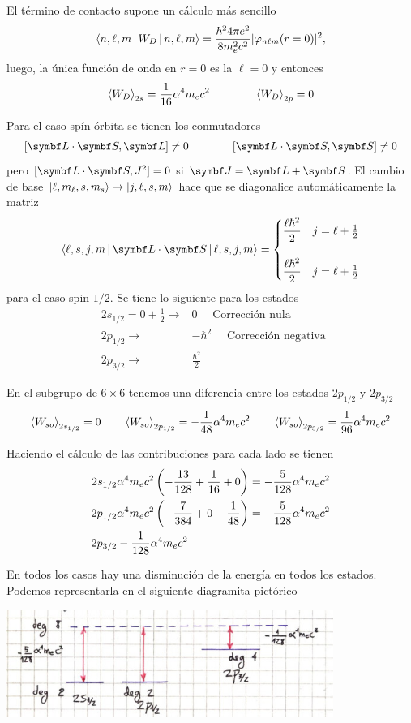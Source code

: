 \documentclass[10pt,oneside]{CBFT_book}
\begin{document}
El término de contacto supone un cálculo más sencillo
\[
	\Braket{n,\ell,m|W_D|n,\ell,m} = \frac{\hbar^2 4 \pi e^2}{8 m_ e^2 c^2} 
	| \varphi_{n\ell m}(r=0)|^2,
\]
luego, la única función de onda en $r=0$ es la $\ell=0$ y entonces
\[
	\Braket{W_D}_{2s} = \frac{1}{16} \alpha^4 m_e c^2
	\qquad \qquad 
	\Braket{W_D}_{2p} = 0
\]

Para el caso spín-órbita se tienen los conmutadores
\[
	[\pe{L}{S}, \vb L] \neq 0 \qquad \qquad [\pe{L}{S}, \vb S] \neq 0
\]
pero $[\pe{L}{S}, J^2]=0$ si $\vb J = \vb L + \vb S$.
El cambio de base $\Ket{\ell,m_\ell,s, m_s} \to \Ket{j,\ell,s,m}$  hace que se diagonalice 
automáticamente la matriz
\[
	\Braket{\ell,s,j,m|\pe{L}{S}|\ell,s,j,m}  = 
	\begin{cases}
	 \displaystyle  \frac{\ell \hbar^2}{2} & j = \ell + \frac 1 2 \\
	 \\
	 \displaystyle  \frac{\ell \hbar^2}{2} & j = \ell + \frac 1 2 
	\end{cases}
\]
para el caso spin $1/2$. Se tiene lo siguiente para los estados 
\begin{eqnarray*}
 &2s_{1/2} = 0 + \frac{1}{2} \longrightarrow & 0 \quad \text{ Corrección nula }\\
 &2p_{1/2} \longrightarrow & -\hbar^2 \quad \text{ Corrección negativa } \\
 &2p_{3/2}  \longrightarrow & \frac{\hbar^2}{2}
 \end{eqnarray*}

 En el subgrupo de $6\times 6$ tenemos una diferencia entre los estados $2p_{1/2}$ y $2p_{3/2}$
 \[
	\Braket{W_{so}}_{2s_{1/2}} = 0
	\qquad 
	\Braket{W_{so}}_{2p_{1/2}} = - \frac{1}{48} \alpha^4 m_e c^2
	\qquad 
	\Braket{W_{so}}_{2p_{3/2}} = \frac{1}{96} \alpha^4 m_e c^2
 \]
 
Haciendo el cálculo de las contribuciones para cada lado se tienen
\begin{eqnarray*}
 2s_{1/2} & \alpha^4 m_e c^2 \left( -\frac{13}{128} + \frac{1}{16} + 0 \right) = 
	-\frac{5}{128} \alpha^4 m_e c^2 \\
 2p_{1/2}  & \alpha^4 m_e c^2 \left( -\frac{7}{384} + 0 - \frac{1}{48}  \right) = 
 -\frac{5}{128} \alpha^4 m_e c^2 \\
 2p_{3/2} & -\frac{1}{128} \alpha^4 m_e c^2
 \end{eqnarray*}
 
 En todos los casos hay una disminución de la energía en todos los estados.
 Podemos representarla en el siguiente diagramita pictórico
 
 \includegraphics[width=0.8\textwidth]{images/fig_ft2_atomo_hidrogeno.jpg}
\end{document}
